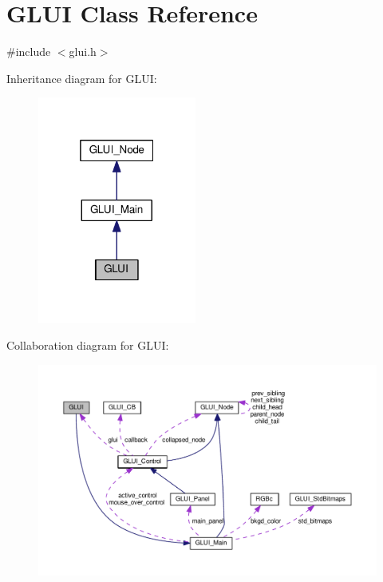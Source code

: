\hypertarget{class_g_l_u_i}{\section{G\+L\+U\+I Class Reference}
\label{class_g_l_u_i}
}


{\ttfamily \#include $<$glui.\+h$>$}



Inheritance diagram for G\+L\+U\+I\+:\nopagebreak
\begin{figure}[H]
\begin{center}
\leavevmode
\includegraphics[width=148pt]{class_g_l_u_i__inherit__graph}
\end{center}
\end{figure}


Collaboration diagram for G\+L\+U\+I\+:\nopagebreak
\begin{figure}[H]
\begin{center}
\leavevmode
\includegraphics[width=350pt]{class_g_l_u_i__coll__graph}
\end{center}
\end{figure}
